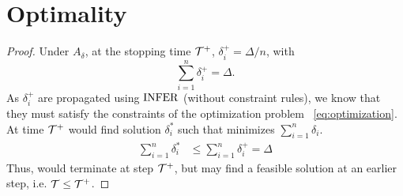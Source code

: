 \section{Optimality}
\label{sec:appendix:optimality}
\begin{proof}
Under $A_\delta$, at the stopping time ${\mathcal{T}}^+$,  $\delta^+_i = \Delta/n$, with 
\[
\sum\limits_{i=1}^{n} \delta^+_i = \Delta.
\]
As $\delta_i^+$ are propagated using $\rm{INFER}$ (without constraint rules), we know that they must satisfy the constraints of the optimization problem ~\ref{eq:optimization}. 
At time ${\mathcal{T}}^+$ \AVOIRmethodname{} would find solution $\delta^*_i$ such that minimizes $\sum\limits_{i=1}^{n} \delta_i$.
\begin{align*}
    \sum\limits_{i=1}^{n} \delta^*_i &\leq \sum\limits_{i=1}^{n} \delta^+_i 
                                     = \Delta
\end{align*}
Thus, \AVOIRmethodname{} would terminate at step ${\mathcal{T}}^+$, but may find a feasible solution at an earlier step, i.e. ${\mathcal{T}} \leq {\mathcal{T}}^+$.

\end{proof}

